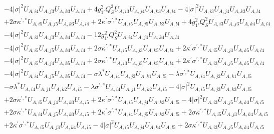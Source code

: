 \begin{align}
 &-4 |\sigma|^2 U_{A,{i 4}} U_{A,{j 3}} U_{A,{k 3}} U_{A,{l 4}} +4 g_{1'}^{2} Q_{S}^{2} U_{A,{i 3}} U_{A,{j 4}} U_{A,{k 3}} U_{A,{l 4}} -4 |\sigma|^2 U_{A,{i 3}} U_{A,{j 4}} U_{A,{k 3}} U_{A,{l 4}} \nonumber \\ 
 &+2 \sigma \kappa^{\prime,*} U_{A,{i 5}} U_{A,{j 5}} U_{A,{k 3}} U_{A,{l 4}} +2 \kappa^\prime \sigma^{\prime,*} U_{A,{i 5}} U_{A,{j 5}} U_{A,{k 3}} U_{A,{l 4}} +4 g_{1'}^{2} Q_{S}^{2} U_{A,{i 3}} U_{A,{j 3}} U_{A,{k 4}} U_{A,{l 4}} \nonumber \\ 
 &-4 |\sigma|^2 U_{A,{i 3}} U_{A,{j 3}} U_{A,{k 4}} U_{A,{l 4}} -12 g_{1'}^{2} Q_{S}^{2} U_{A,{i 4}} U_{A,{j 4}} U_{A,{k 4}} U_{A,{l 4}} \nonumber \\ 
 &-4 |\sigma|^2 U_{A,{i 5}} U_{A,{j 5}} U_{A,{k 4}} U_{A,{l 4}} +2 \sigma \kappa^{\prime,*} U_{A,{i 5}} U_{A,{j 3}} U_{A,{k 5}} U_{A,{l 4}} +2 \kappa^\prime \sigma^{\prime,*} U_{A,{i 5}} U_{A,{j 3}} U_{A,{k 5}} U_{A,{l 4}} \nonumber \\ 
 &-4 |\sigma|^2 U_{A,{i 5}} U_{A,{j 4}} U_{A,{k 5}} U_{A,{l 4}} +2 \sigma \kappa^{\prime,*} U_{A,{i 3}} U_{A,{j 5}} U_{A,{k 5}} U_{A,{l 4}} +2 \kappa^\prime \sigma^{\prime,*} U_{A,{i 3}} U_{A,{j 5}} U_{A,{k 5}} U_{A,{l 4}} \nonumber \\ 
 &-4 |\sigma|^2 U_{A,{i 4}} U_{A,{j 5}} U_{A,{k 5}} U_{A,{l 4}} - \sigma \lambda^* U_{A,{i 4}} U_{A,{j 2}} U_{A,{k 1}} U_{A,{l 5}} - \lambda \sigma^{\prime,*} U_{A,{i 4}} U_{A,{j 2}} U_{A,{k 1}} U_{A,{l 5}} \nonumber \\ 
 &- \sigma \lambda^* U_{A,{i 4}} U_{A,{j 1}} U_{A,{k 2}} U_{A,{l 5}} - \lambda \sigma^{\prime,*} U_{A,{i 4}} U_{A,{j 1}} U_{A,{k 2}} U_{A,{l 5}} -4 |\sigma|^2 U_{A,{i 5}} U_{A,{j 3}} U_{A,{k 3}} U_{A,{l 5}} \nonumber \\ 
 &+2 \sigma \kappa^{\prime,*} U_{A,{i 5}} U_{A,{j 4}} U_{A,{k 3}} U_{A,{l 5}} +2 \kappa^\prime \sigma^{\prime,*} U_{A,{i 5}} U_{A,{j 4}} U_{A,{k 3}} U_{A,{l 5}} -4 |\sigma|^2 U_{A,{i 3}} U_{A,{j 5}} U_{A,{k 3}} U_{A,{l 5}} \nonumber \\ 
 &+2 \sigma \kappa^{\prime,*} U_{A,{i 4}} U_{A,{j 5}} U_{A,{k 3}} U_{A,{l 5}} +2 \kappa^\prime \sigma^{\prime,*} U_{A,{i 4}} U_{A,{j 5}} U_{A,{k 3}} U_{A,{l 5}} +2 \sigma \kappa^{\prime,*} U_{A,{i 5}} U_{A,{j 3}} U_{A,{k 4}} U_{A,{l 5}} \nonumber \\ 
 &+2 \kappa^\prime \sigma^{\prime,*} U_{A,{i 5}} U_{A,{j 3}} U_{A,{k 4}} U_{A,{l 5}} -4 |\sigma|^2 U_{A,{i 5}} U_{A,{j 4}} U_{A,{k 4}} U_{A,{l 5}} +2 \sigma \kappa^{\prime,*} U_{A,{i 3}} U_{A,{j 5}} U_{A,{k 4}} U_{A,{l 5}} \nonumber \\ 

\end{align}
